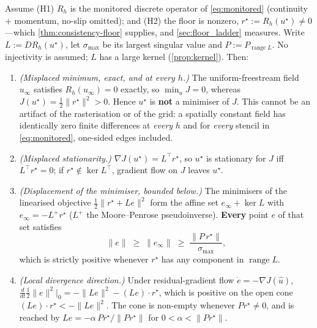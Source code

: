 \begin{theorem}
\label{thm:residual-floor}
Assume \textup{(H1)} $R_h$ is the monitored discrete operator of \eqref{eq:monitored}
(continuity $+$ momentum, no-slip omitted); and \textup{(H2)} the floor is nonzero,
$r^\star:=R_h(u^\star)\neq0$---which \autoref{thm:consistency-floor} supplies, and
\autoref{sec:floor_ladder} measures. Write $L:=DR_h(u^\star)$, let $\sigma_{\max}$ be its
largest singular value and $P:=P_{\operatorname{range}L}$. No injectivity is assumed; $L$
has a large kernel (\autoref{prop:kernel}). Then:
\begin{enumerate}
\item[\textup{(i)}] \emph{(Misplaced minimum, exact, and at every $h$.)} The
uniform-freestream field $u_\infty$ satisfies $R_h(u_\infty)=0$ exactly, so $\min_uJ=0$,
whereas $J(u^\star)=\tfrac12\|r^\star\|^2>0$. Hence $u^\star$ is \textbf{not} a minimiser
of $J$. This cannot be an artifact of the rasterisation or of the grid: a spatially
constant field has identically zero finite differences at \emph{every} $h$ and for
\emph{every} stencil in \eqref{eq:monitored}, one-sided edges included.
\item[\textup{(ii)}] \emph{(Misplaced stationarity.)} $\nabla J(u^\star)=L^\top r^\star$,
so $u^\star$ is stationary for $J$ iff $L^\top r^\star=0$; if $r^\star\notin\ker L^\top$,
gradient flow on $J$ leaves $u^\star$.
\item[\textup{(iii)}] \emph{(Displacement of the minimiser, bounded below.)} The
minimisers of the linearised objective $\tfrac12\|r^\star+Le\|^2$ form the affine set
$e_\infty+\ker L$ with $e_\infty=-L^{+}r^\star$ ($L^{+}$ the Moore--Penrose
pseudoinverse). \textbf{Every} point $e$ of that set satisfies
\begin{equation}
\|e\|\;\ge\;\|e_\infty\|\;\ge\;\frac{\|P\,r^\star\|}{\sigma_{\max}},
\label{eq:rf-lower}
\end{equation}
which is strictly positive whenever $r^\star$ has any component in $\operatorname{range}L$.
\item[\textup{(iv)}] \emph{(Local divergence direction.)} Under residual-gradient flow
$\dot e=-\nabla J(\hat u)$,
$\frac{d}{dt}\tfrac12\|e\|^2\big|_0=-\|Le\|^2-(Le)\cdot r^\star$, which is positive on the
open cone $(Le)\cdot r^\star<-\|Le\|^2$. The cone is non-empty whenever $Pr^\star\neq0$,
and is reached by $Le=-\alpha\,Pr^\star/\|Pr^\star\|$ for $0<\alpha<\|Pr^\star\|$.
\end{enumerate}
\end{theorem}

